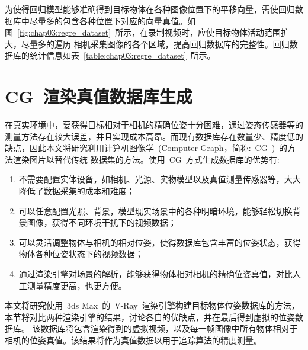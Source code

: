 为使得回归模型能够准确得到目标物体在各种图像位置下的平移向量，需使回归数据库中尽量多的包含各种位置下对应的向量真值。如图~\ref{fig:chap03:regre_dataset}~所示，在录制视频时，应使目标物体活动范围扩大，尽量多的遍历
相机采集图像的各个区域，提高回归数据库的完整性。回归数据库的统计信息如表~\ref{table:chap03:regre_dataset}~所示。

\section{CG~渲染真值数据库生成}
\label{sec:dataset_engine}
在真实环境中，要获得目标相对于相机的精确位姿十分困难，通过姿态传感器等的测量方法存在较大误差，并且实现成本高昂。而现有数据库存在数量少、精度低的缺点，因此本文将研究利用计算机图像学~(Computer Graph，简称:~CG~)~的方法渲染图片以替代传统
数据集的方法。使用~CG~方式生成数据库的优势有:
\begin{enumerate}[(1)] 
  \item 不需要配置实体设备，如相机、光源、实物模型以及真值测量传感器等，大大降低了数据采集的成本和难度；
  \item 可以任意配置光照、背景，模型现实场景中的各种明暗环境，能够轻松切换背景图像，获得不同环境干扰下的视频数据；
  \item 可以灵活调整物体与相机的相对位姿，使得数据库包含丰富的位姿状态，获得物体各种位姿状态下的视频数据；
  \item 通过渲染引擎对场景的解析，能够获得物体相对相机的精确位姿真值，对比人工测量精度更高，也更方便。
\end{enumerate}

本文将研究使用~3ds Max~的~V-Ray~渲染引擎构建目标物体位姿数据库的方法，本节将对比两种渲染引擎的结果，讨论各自的优缺点，并在最后得到虚拟的位姿数据库。
该数据库将包含渲染得到的虚拟视频，以及每一帧图像中所有物体相对于相机的位姿真值。该结果将作为真值数据以用于追踪算法的精度测量。
